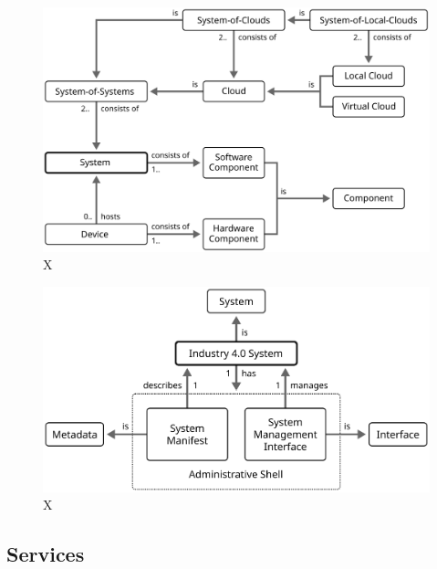 \begin{figure}[ht!]
  \centering
  \includegraphics{figures/system-composition}
  \caption{
    X
  }
  \label{fig:system-composition}
\end{figure}

\begin{figure}[ht!]
  \centering
  \includegraphics{figures/system-industry40}
  \caption{
    X
  }
  \label{fig:system-industry40}
\end{figure}

\subsection{Services}